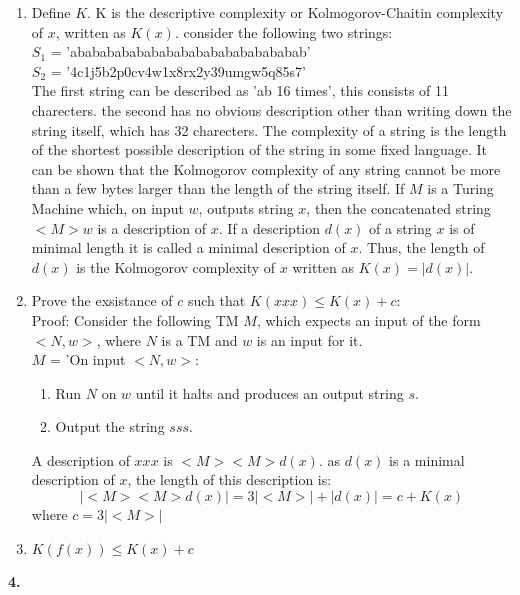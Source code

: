 \documentclass[a4paper,12pt]{article}
\begin{document}
\begin{enumerate}[label=\alph*)]
\item Define $K$. K is the descriptive complexity or Kolmogorov-Chaitin complexity of $x$, written as $K(x)$. consider the following two strings: \\
$S_1$ = 'abababababababababababababababab'\\
$S_2$ = '4c1j5b2p0cv4w1x8rx2y39umgw5q85s7'\\
The first string can be described as 'ab 16 times', this consists of 11 charecters. the second has no obvious description other than writing down the string itself, which has 32 charecters. The complexity of a string is the length of the shortest possible description of the string in some fixed language. It can be shown that the Kolmogorov complexity of any string cannot be more than a few bytes larger than the length of the string itself. If $M$ is a Turing Machine which, on input $w$, outputs string $x$, then the concatenated string $<M> w$ is a description of $x$. If a description $d(x)$ of a string $x$ is of minimal length it is called a minimal description of $x$. Thus, the length of $d(x)$ is the Kolmogorov complexity of $x$ written as $K(x) = |d(x)|$.
\item Prove the exsistance of $c$ such that $K(xxx) \leq K(x)+c$: \\
Proof: Consider the following TM $M$, which expects an input of the form $<N, w>$, where $N$ is a TM and $w$ is an input for it. \\
$M$ = 'On input $<N, w>$:
\begin{enumerate}[label=\arabic*)]
\item Run $N$ on $w$ until it halts and produces an output string $s$.
\item Output the string $sss$.
\end{enumerate}
A description of $xxx$ is $<M><M>d(x)$. as $d(x)$ is a minimal description of $x$, the length of this description is:
$$|<M><M>d(x)| = 3|<M>| + |d(x)| = c + K(x)$$
where $c=3|<M>|$
\item $K(f(x)) \leq K(x) + c$
\end{enumerate}
\noindent \textbf{4.}
\end{document}
